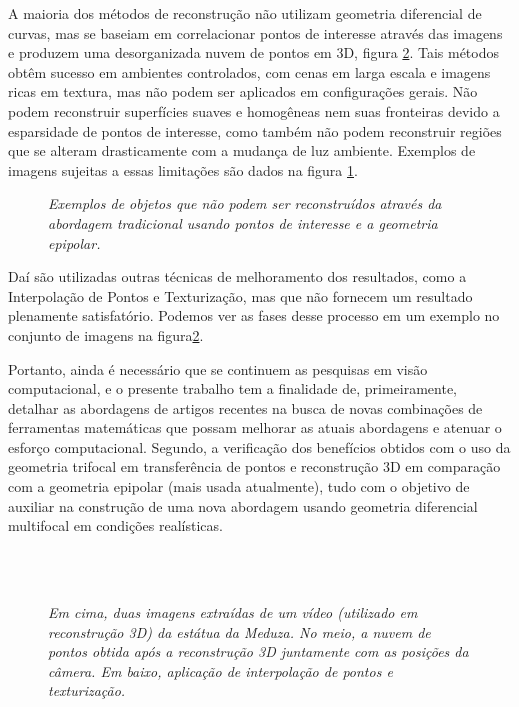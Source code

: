 A maioria dos métodos de reconstrução não utilizam geometria diferencial de curvas, mas se baseiam em correlacionar pontos de interesse através das imagens e produzem uma desorganizada nuvem de pontos em 3D, figura \ref{fig.medusa}. Tais métodos obtêm sucesso em ambientes controlados, com cenas em larga escala e imagens ricas em textura, mas não podem ser aplicados em configurações gerais. Não podem reconstruir superfícies suaves e homogêneas nem suas fronteiras devido a esparsidade de pontos de interesse, como também não podem reconstruir regiões que se alteram drasticamente com a mudança de luz ambiente. Exemplos de imagens sujeitas a essas limitações são dados na figura \ref{fig.carro-objeto-curvo}.
\begin{figure}[!htb]
\centering
{}
\quad
{}
\caption{{\it Exemplos de objetos que não podem ser reconstruídos através da abordagem tradicional usando pontos de interesse e a geometria epipolar.}}
\label{fig.carro-objeto-curvo}
\end{figure}  
Daí são utilizadas outras técnicas de melhoramento dos resultados, como a Interpolação de Pontos e Texturização, mas que não fornecem um resultado plenamente satisfatório. Podemos ver as fases desse processo em um exemplo no conjunto de imagens na figura\ref{fig.medusa}.

Portanto, ainda é necessário que se continuem as pesquisas em visão computacional, e o presente trabalho tem a finalidade de, primeiramente, detalhar as abordagens de artigos recentes na busca de novas combinações de ferramentas matemáticas que possam melhorar as atuais abordagens e atenuar o esforço computacional. Segundo, a verificação dos benefícios obtidos com o uso da geometria trifocal em transferência de pontos e reconstrução 3D em comparação com a geometria epipolar (mais usada atualmente), tudo com o objetivo de auxiliar na construção de uma nova abordagem usando geometria diferencial multifocal em condições realísticas.

\begin{figure}[!htb]
\centering
{}
\quad
{}
\\
\quad
{}
\\
\quad
{}
\caption{{\it Em cima, duas imagens extraídas de um vídeo (utilizado em reconstrução 3D) da estátua da Meduza. No meio, a nuvem de pontos obtida após a reconstrução 3D juntamente com as posições da câmera. Em baixo, aplicação de interpolação de pontos e texturização.}}
\label{fig.medusa}
\end{figure}

